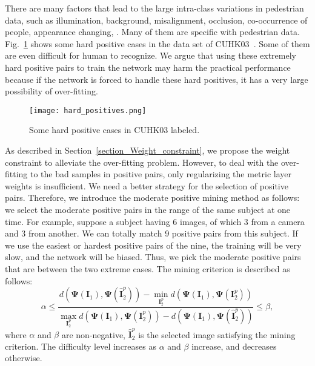 \documentclass[10pt,twocolumn,letterpaper]{article}
\begin{document}
There are many factors that lead to the large intra-class variations in pedestrian data, such as illumination, background, misalignment, occlusion, co-occurrence of people, appearance changing, \etc.
Many of them are specific with pedestrian data.
Fig.~\ref{hard-positives} shows some hard positive cases in the data set of CUHK03~\cite{li2014deepreid}.
Some of them are even difficult for human to recognize.
We argue that using these extremely hard positive pairs to train the network may harm the practical performance because if the network is forced to handle these hard positives, it has a very large possibility of over-fitting.
\begin{figure}[!htb]
  \centering
  \texttt{[image: hard\_positives.png]}
  \caption{Some hard positive cases in CUHK03 labeled.}
  \label{hard-positives}
\end{figure}

As described in Section~\ref{section_Weight_constraint}, we propose the weight constraint to alleviate the over-fitting problem.
However, to deal with the over-fitting to the bad samples in positive pairs, only regularizing the metric layer weights is insufficient.
We need a better strategy for the selection of positive pairs.
Therefore, we introduce the moderate positive mining method as follows: we select the moderate positive pairs in the range of the same subject at one time.
For example, suppose a subject having 6 images, of which 3 from a camera and 3 from another.
We can totally match 9 positive pairs from this subject.
If we use the easiest or hardest positive pairs of the nine, the training will be very slow, and the network will be biased.
Thus, we pick the moderate positive pairs that are between the two extreme cases.
The mining criterion is described as follows:
\begin{equation}\label{Loss-epm}
     \alpha \leq \frac{d(\mathbf{\Psi}(\mathbf{I}_1), \mathbf{\Psi}(\hat{\mathbf{I}}_2^p)) - \min_{\mathbf{I}_2^p}{d(\mathbf{\Psi}(\mathbf{I}_1), \mathbf{\Psi}(\mathbf{I}_2^p))}}
     {\max_{\mathbf{I}_2^p}{d(\mathbf{\Psi}(\mathbf{I}_1), \mathbf{\Psi}(\mathbf{I}_2^p))} - d(\mathbf{\Psi}(\mathbf{I}_1), \mathbf{\Psi}(\hat{\mathbf{I}}_2^p))} \leq \beta,
\end{equation}
where $\alpha$ and $\beta$ are non-negative, $\hat{\mathbf{I}}_2^p$ is the selected image satisfying the mining criterion. %
The difficulty level increases as $\alpha$ and $\beta$ increase, and decreases otherwise.
\end{document}

